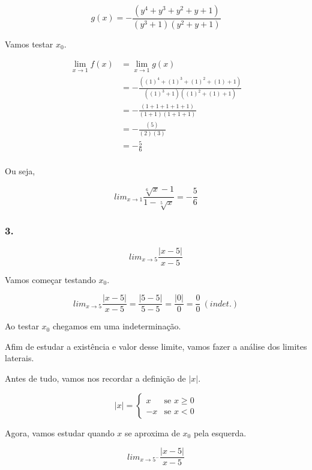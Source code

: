 \documentclass{article}
\begin{document}
\begin{equation}
    g(x) = -\frac{(y^4+y^3+y^2+y+1)}{(y^3+1)(y^2+y+1)}
\end{equation}

Vamos testar \(x_0\).

\begin{align*}
    \lim_{x\to 1} f(x)
     & = \lim_{x\to 1} g(x)                                        \\
     & = -\frac{((1)^4+(1)^3+(1)^2+(1)+1)}{((1)^3+1)((1)^2+(1)+1)} \\
     & = -\frac{(1+1+1+1+1)}{(1+1)(1+1+1)}                         \\
     & = -\frac{(5)}{(2)(3)}                                       \\
     & = -\frac{5}{6}                                              \\
\end{align*}

Ou seja,

\[
    lim_{x\to 1} \frac{\sqrt[6]{x}-1}{1-\sqrt[5]{x}} = -\frac{5}{6}
\]

\subsubsection*{3.}

\[
    lim_{x\to 5} \frac{|x-5|}{x-5}
\]

Vamos começar testando \(x_0\).

\[
    lim_{x\to 5} \frac{|x-5|}{x-5}
    = \frac{|5-5|}{5-5}
    = \frac{|0|}{0}
    = \frac{0}{0} \ (indet.)
\]

Ao testar \(x_0\) chegamos em uma indeterminação.

Afim de estudar a existência e valor desse limite, vamos fazer a análise dos limites laterais.

Antes de tudo, vamos nos recordar a definição de \(|x|\).

\begin{equation} \label{modulus_definition}
    |x| =
    \left\{
    \begin{array}{ll}
        x  & \mbox{se } x \geq 0 \\
        -x & \mbox{se } x < 0
    \end{array}
    \right.
\end{equation}

Agora, vamos estudar quando \(x\) se aproxima de \(x_0\) pela esquerda.

\[
    lim_{x\to 5^-} \frac{|x-5|}{x-5}
\]
\end{document}
